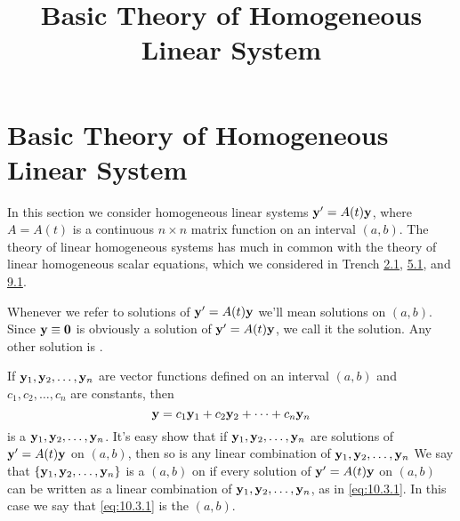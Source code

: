 \documentclass{ximera}
\title{Basic Theory of Homogeneous Linear System}%
\begin{document}
\begin{abstract}

\end{abstract}

\maketitle

\section*{Basic Theory of Homogeneous Linear System}

In this section we consider homogeneous linear systems ${\bf y}'=
A(t){\bf y}$, where $A=A(t)$ is a continuous $n\times n$ matrix
function on an interval $(a,b)$. The theory of linear homogeneous
systems has much in common with the theory of linear homogeneous
scalar equations, which we considered in
Trench \href{https://ximera.osu.edu/ode/main/linearFirstOrderDiffEq/linearFirstOrderDiffEq}{2.1}, \href{https://ximera.osu.edu/ode/main/homogeneousLinearEquations/homogeneousLinearEquations}{5.1}, and \href{https://ximera.osu.edu/ode/main/linearHigherOrder/linearHigherOrder}{9.1}.

Whenever we refer to solutions of ${\bf y}'=A(t){\bf y}$ we'll mean
solutions on $(a,b)$. Since ${\bf y}\equiv{\bf 0}$ is obviously a
solution of ${\bf y}'=A(t){\bf y}$, we call it the 
solution. Any other solution is .

If ${\bf y}_1, {\bf y}_2, \dots, {\bf y}_n$ are vector functions
defined on an interval $(a,b)$ and $c_1, c_2, \dots, c_n$ are
constants, then
\begin{equation} \label{eq:10.3.1}
{\bf y}=c_1{\bf y}_1+c_2{\bf y}_2+\cdots+c_n{\bf y}_n
\end{equation}
is a  ${\bf y}_1, {\bf y}_2, \ldots,{\bf
y}_n$. It's easy show that if ${\bf
y}_1, {\bf y}_2, \dots,{\bf y}_n$ are solutions of ${\bf y}'=A(t){\bf
y}$ on $(a,b)$, then so is any linear combination of
 ${\bf y}_1, {\bf y}_2, \dots, {\bf y}_n$ %
 We say that
$\{{\bf y}_1,{\bf y}_2,\dots,{\bf y}_n\}$ is a  $(a,b)$ on if every solution of
${\bf y}'=A(t){\bf y}$ on $(a,b)$ can be written as a linear combination of
${\bf y}_1, {\bf y}_2, \dots, {\bf y}_n$, as in \eqref{eq:10.3.1}.
In this
case we say that \eqref{eq:10.3.1} is the  $(a,b)$.
\end{document}

